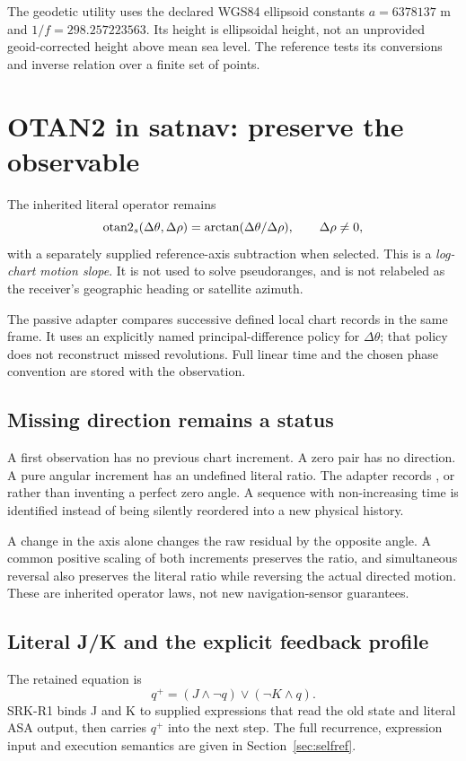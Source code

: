 The geodetic utility uses the declared WGS84 ellipsoid constants $a=6378137$ m and
$1/f=298.257223563$. Its height is ellipsoidal height, not an unprovided geoid-corrected
height above mean sea level. The reference tests its conversions and inverse relation
over a finite set of points. 
\clearpage

\section{OTAN2 in satnav: preserve the observable}
The inherited literal operator remains
\begin{equation}
\operatorname{otan2}_s(\Delta\theta,\Delta\rho)=\arctan(\Delta\theta/\Delta\rho),
\qquad \Delta\rho\ne0,
\end{equation}
with a separately supplied reference-axis subtraction when selected. This is a
\emph{log-chart motion slope}. It is not used to solve pseudoranges, and is not
relabeled as the receiver's geographic heading or satellite azimuth. \base

The passive adapter compares successive defined local chart records in the same
frame. It uses an explicitly named principal-difference policy for $\Delta\theta$;
that policy does not reconstruct missed revolutions. Full linear time and the
chosen phase convention are stored with the observation.

\subsection{Missing direction remains a status}
A first observation has no previous chart increment. A zero pair has no direction.
A pure angular increment has an undefined literal ratio. The adapter records
,  or  rather
than inventing a perfect zero angle. A sequence with non-increasing time is identified
instead of being silently reordered into a new physical history.

A change in the axis alone changes the raw residual by the opposite angle. A common
positive scaling of both increments preserves the ratio, and simultaneous reversal
also preserves the literal ratio while reversing the actual directed motion. These
are inherited operator laws, not new navigation-sensor guarantees.

\subsection{Literal J/K and the explicit feedback profile}
The retained equation is
\begin{equation}
q^+=(J\land\neg q)\lor(\neg K\land q).
\end{equation}
SRK-R1 binds J and K to supplied expressions that read the old state and literal
ASA output, then carries $q^+$ into the next step. The full recurrence, expression
input and execution semantics are given in Section~\ref{sec:selfref}.

